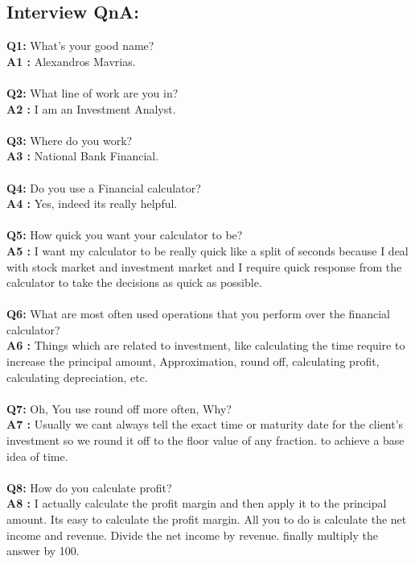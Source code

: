 \documentclass{article}
\begin{document}
\subsection{Interview QnA:}
\noindent
\textbf{Q1: } What's your good name? \\
\textbf{A1 : } Alexandros Mavrias. \\ \\
\textbf{Q2: } What line of work are you in? \\
\textbf{A2 : } I am an Investment Analyst.\\ \\
\textbf{Q3: } Where do you work? \\
\textbf{A3 : } National Bank Financial.\\ \\
\textbf{Q4: } Do you use a Financial calculator? \\
\textbf{A4 : } Yes, indeed its really helpful.\\ \\
\textbf{Q5: } How quick you want your calculator to be? \\
\textbf{A5 : } I want my calculator to be really quick like a split of seconds because I deal with stock market and investment market and I require quick response from the calculator to take the decisions as quick as possible.\\ \\
\textbf{Q6: } What are most often used operations that you perform over the financial calculator? \\
\textbf{A6 : } Things which are related to investment, like calculating the time require to increase the principal amount, Approximation, round off, calculating profit, calculating depreciation, etc. \\ \\
\textbf{Q7: } Oh, You use round off more often, Why? \\
\textbf{A7 : } Usually we cant always tell the exact time or maturity date for the client's investment so we round it off to the floor value of any fraction. to achieve a base idea of time. \\ \\
\textbf{Q8: } How do you calculate profit? \\
\textbf{A8 : } I actually calculate the profit margin and then apply it to the principal amount. Its easy to calculate the profit margin. All you to do is calculate the net income and revenue. Divide the net income by revenue. finally multiply the answer by 100. \\ \\
\end{document}
